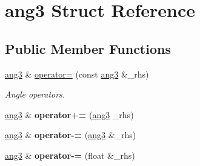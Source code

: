 \hypertarget{structang3}{\section{ang3 Struct Reference}
\label{structang3}
}
\subsection*{Public Member Functions}
\begin{DoxyCompactItemize}
\item 
\hypertarget{structang3_a81fccf3906c3b5f0d0ac7abef079164e}{\hyperlink{structang3}{ang3} \& \hyperlink{structang3_a81fccf3906c3b5f0d0ac7abef079164e}{operator=} (const \hyperlink{structang3}{ang3} \&\-\_\-rhs)}\label{structang3_a81fccf3906c3b5f0d0ac7abef079164e}

\begin{DoxyCompactList}\small\item\em Angle operators. \end{DoxyCompactList}\item 
\hypertarget{structang3_ab5df00e83431aba900e45d973f81ac34}{\hyperlink{structang3}{ang3} \& {\bfseries operator+=} (\hyperlink{structang3}{ang3} \-\_\-rhs)}\label{structang3_ab5df00e83431aba900e45d973f81ac34}

\item 
\hypertarget{structang3_a10518b18e996760d6e85158ddcef2919}{\hyperlink{structang3}{ang3} \& {\bfseries operator-\/=} (\hyperlink{structang3}{ang3} \&\-\_\-rhs)}\label{structang3_a10518b18e996760d6e85158ddcef2919}

\item 
\hypertarget{structang3_a997a0fbea191f413a485065c249b1085}{\hyperlink{structang3}{ang3} \& {\bfseries operator-\/=} (float \&\-\_\-rhs)}\label{structang3_a997a0fbea191f413a485065c249b1085}

\end{DoxyCompactItemize}
